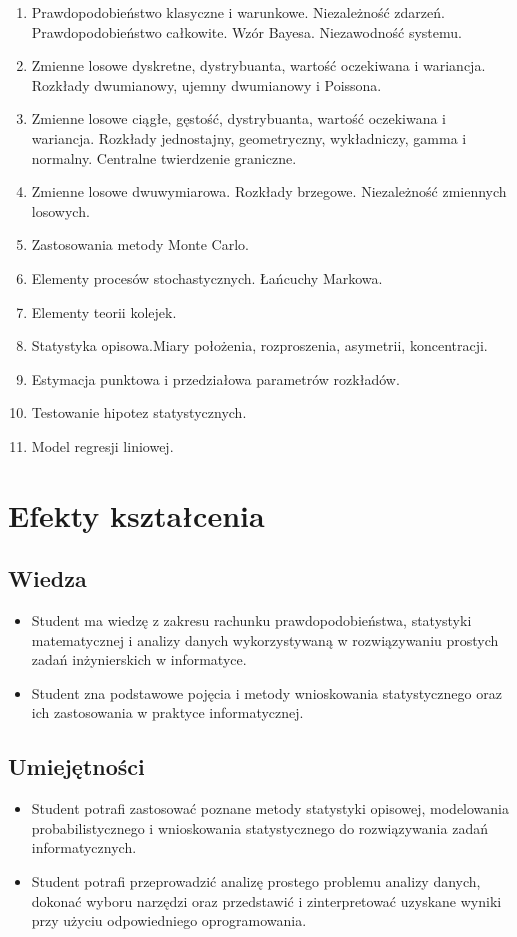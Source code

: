 \documentclass[12pt, a4paper]{article}
\begin{document}
\begin{enumerate}
  \item Prawdopodobieństwo klasyczne i warunkowe. Niezależność zdarzeń. Prawdopodobieństwo całkowite. Wzór Bayesa. Niezawodność systemu.
  \item Zmienne losowe dyskretne, dystrybuanta, wartość oczekiwana i wariancja. Rozkłady dwumianowy, ujemny dwumianowy i Poissona.
  \item Zmienne losowe ciągłe, gęstość, dystrybuanta, wartość oczekiwana i wariancja. Rozkłady jednostajny, geometryczny, wykładniczy, gamma i normalny. Centralne twierdzenie graniczne.
  \item Zmienne losowe dwuwymiarowa. Rozkłady brzegowe. Niezależność zmiennych losowych.
  \item Zastosowania metody Monte Carlo.
  \item Elementy procesów stochastycznych. Łańcuchy Markowa.
  \item Elementy teorii kolejek.
  \item Statystyka opisowa.Miary położenia, rozproszenia, asymetrii, koncentracji.
  \item Estymacja punktowa i przedziałowa parametrów rozkładów.
  \item Testowanie hipotez statystycznych.
  \item Model regresji liniowej.
\end{enumerate}

\section{Efekty kształcenia}

\subsection*{Wiedza}
\begin{itemize}
  \item Student ma wiedzę z zakresu rachunku prawdopodobieństwa, statystyki matematycznej i analizy danych wykorzystywaną w rozwiązywaniu prostych zadań inżynierskich w informatyce.
  \item Student zna podstawowe pojęcia i metody wnioskowania statystycznego oraz ich zastosowania w praktyce informatycznej.
\end{itemize}

\subsection*{Umiejętności}
\begin{itemize}
  \item Student potrafi zastosować poznane metody statystyki opisowej, modelowania probabilistycznego i wnioskowania statystycznego do rozwiązywania zadań informatycznych.
  \item Student potrafi przeprowadzić analizę prostego problemu analizy danych, dokonać wyboru narzędzi oraz przedstawić i zinterpretować uzyskane wyniki przy użyciu odpowiedniego oprogramowania.
\end{itemize}
\end{document}
